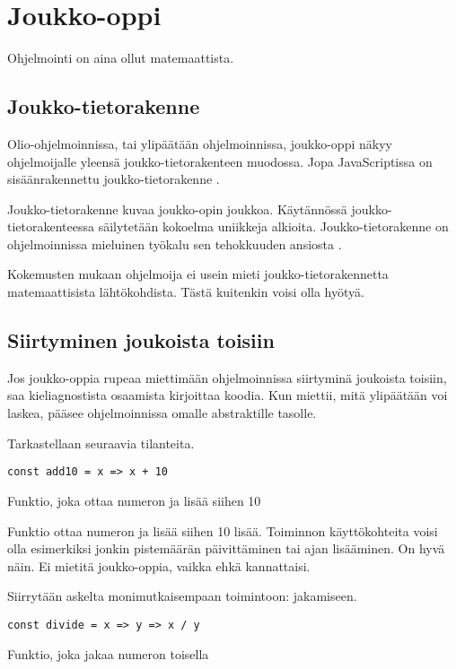\section{Joukko-oppi}

Ohjelmointi on aina ollut matemaattista.

\subsection{Joukko-tietorakenne}

Olio-ohjelmoinnissa, tai ylipäätään ohjelmoinnissa, joukko-oppi näkyy ohjelmoijalle yleensä joukko-tietorakenteen muodossa. Jopa JavaScriptissa on sisäänrakennettu joukko-tietorakenne \cite{mdn_set}.

Joukko-tietorakenne kuvaa joukko-opin joukkoa. Käytännössä joukko-tietorakenteessa säilytetään kokoelma uniikkeja alkioita. Joukko-tietorakenne on ohjelmoinnissa mieluinen työkalu sen tehokkuuden ansiosta \cite{ecma_spec}.

Kokemusten mukaan ohjelmoija ei usein mieti joukko-tietorakennetta matemaattisista lähtökohdista. Tästä kuitenkin voisi olla hyötyä.



\subsection{Siirtyminen joukoista toisiin}
Jos joukko-oppia rupeaa miettimään ohjelmoinnissa siirtyminä joukoista toisiin, saa kieliagnostista osaamista kirjoittaa koodia. Kun miettii, mitä ylipäätään voi laskea, pääsee ohjelmoinnissa omalle abstraktille tasolle. \citep{Tan2004,BlellochHarper2015}

Tarkastellaan seuraavia tilanteita.

\begin{code}
	\begin{verbatim}
const add10 = x => x + 10  
\end{verbatim}
	\caption{Funktio, joka ottaa numeron ja lisää siihen 10}
	\label{code:ts_set_theory_1}
\end{code}

Funktio ottaa numeron ja lisää siihen 10 lisää. Toiminnon käyttökohteita voisi olla esimerkiksi jonkin pistemäärän päivittäminen tai ajan lisääminen. On hyvä näin. Ei mietitä joukko-oppia, vaikka ehkä kannattaisi.

Siirrytään askelta monimutkaisempaan toimintoon: jakamiseen.


\begin{code}
	\begin{verbatim}
const divide = x => y => x / y
\end{verbatim}
	\caption{Funktio, joka jakaa numeron toisella}
	\label{code:ts_set_theory_3}
\end{code}

